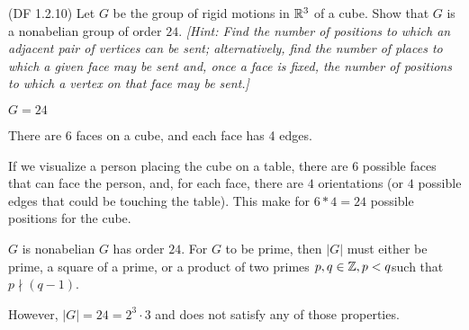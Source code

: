 \begin{problem}{\textsf{(DF 1.2.10)}}
  Let $G$ be the group of rigid motions in $\mathbb{R}^3$ of a cube.  Show that $G$ is a 
  nonabelian group of order $24$.  \emph{[Hint: Find the number of positions to which
  an adjacent pair of vertices can be sent; alternatively, find the number of places 
  to which a given face may be sent and, once a face is fixed, the number of 
  positions to which a vertex on that face may be sent.]}
\end{problem}
\begin{Answer}
  \begin{enumalph}
    \item $G = 24$
    
    \noindent
    There are $6$ faces on a cube, and each face has 4 edges.
  
    \noindent
    If we visualize a person placing the cube on a table,
    there are $6$ possible faces that can face the person, and, for each face,
    there are $4$ orientations (or $4$ possible edges that could be touching the table).
    This make for $6 * 4 = 24$ possible positions for the cube.

    \item $G$ is nonabelian
    $G$ has order $24$. For $G$ to be prime, then $|G|$ must either be prime, a square of a prime,
    or a product of two primes $p, q \in \mathbb{Z}, p < q$such that $p \nmid (q - 1)$.
    
    
    \noindent
    However, $|G| = 24 = 2^{3} \cdot 3$ and does not satisfy any of those properties.
  \end{enumalph}
\end{Answer}
